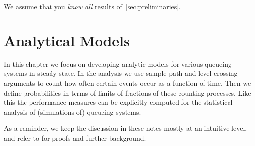 We assume that you  \emph{know all} results of~\cref{sec:preliminaries}. 









%    



\chapter{Analytical Models}
\label{cha:analytical-models}

In this chapter we focus on developing analytic models for various queueing systems in steady-state.
In the analysis we use sample-path and level-crossing arguments to count how often certain events occur as a function of time.
Then we define probabilities in terms of limits of fractions of these counting processes.
Like this the performance measures can be explicitly computed for the statistical analysis of (simulations of) queueing systems.


As a reminder, we keep the discussion in these notes mostly at an intuitive level, and refer to \cite{el-taha98:_sampl_path_analy_queuein_system} for proofs and further background.













% 
%


%    

